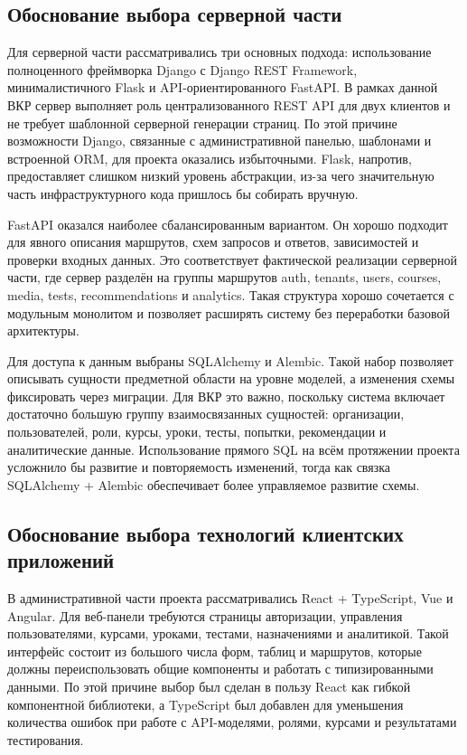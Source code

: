 \subsection{Обоснование выбора серверной части}

Для серверной части рассматривались три основных подхода: использование полноценного фреймворка Django с Django REST Framework, минималистичного Flask и API-ориентированного FastAPI. В рамках данной ВКР сервер выполняет роль централизованного REST API для двух клиентов и не требует шаблонной серверной генерации страниц. По этой причине возможности Django, связанные с административной панелью, шаблонами и встроенной ORM, для проекта оказались избыточными. Flask, напротив, предоставляет слишком низкий уровень абстракции, из-за чего значительную часть инфраструктурного кода пришлось бы собирать вручную\cite{fastapi_docs,django_rest_framework}.

FastAPI оказался наиболее сбалансированным вариантом. Он хорошо подходит для явного описания маршрутов, схем запросов и ответов, зависимостей и проверки входных данных. Это соответствует фактической реализации серверной части, где сервер разделён на группы маршрутов auth, tenants, users, courses, media, tests, recommendations и analytics. Такая структура хорошо сочетается с модульным монолитом и позволяет расширять систему без переработки базовой архитектуры\cite{fastapi_docs}.

Для доступа к данным выбраны SQLAlchemy и Alembic\cite{sqlalchemy_docs}. Такой набор позволяет описывать сущности предметной области на уровне моделей, а изменения схемы фиксировать через миграции. Для ВКР это важно, поскольку система включает достаточно большую группу взаимосвязанных сущностей: организации, пользователей, роли, курсы, уроки, тесты, попытки, рекомендации и аналитические данные. Использование прямого SQL на всём протяжении проекта усложнило бы развитие и повторяемость изменений, тогда как связка SQLAlchemy + Alembic обеспечивает более управляемое развитие схемы.

\subsection{Обоснование выбора технологий клиентских приложений}

В административной части проекта рассматривались React + TypeScript, Vue и Angular. Для веб-панели требуются страницы авторизации, управления пользователями, курсами, уроками, тестами, назначениями и аналитикой. Такой интерфейс состоит из большого числа форм, таблиц и маршрутов, которые должны переиспользовать общие компоненты и работать с типизированными данными. По этой причине выбор был сделан в пользу React как гибкой компонентной библиотеки, а TypeScript был добавлен для уменьшения количества ошибок при работе с API-моделями, ролями, курсами и результатами тестирования\cite{react_docs,typescript_docs}.

